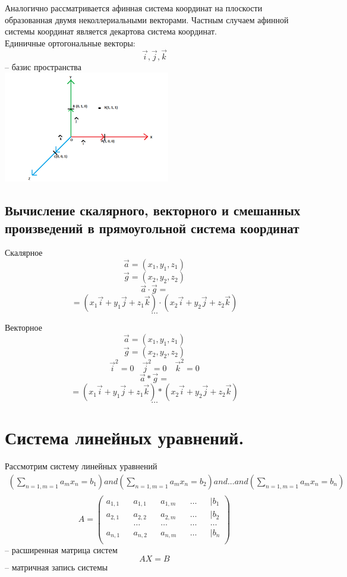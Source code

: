 \documentclass[a4paper, 12pt]{article}
\begin{document}
Аналогично рассматривается афинная система координат на плоскости образованная двумя неколлериальными векторами. Частным случаем афинной системы координат является декартова система координат.\\

Единичные ортогональные векторы:
\[
	\vec{i},\vec{j},\vec{k}   
\]
-- базис пространства\\
\includegraphics{orth_vec}\\

\subsection{Вычисление скалярного, векторного и смешанных произведений в прямоугольной система координат}

Скалярное
\[
	\vec{a} = (x_1,y_1,z_1) 
\]
\[
	\vec{g} = (x_2,y_2,z_2) 
\]
\[
	\vec{a}\cdot \vec{g} =   	
\]
\[
	= (x_1 \vec{i} + y_1 \vec{j} + z_1 \vec{k})\cdot(x_2 \vec{i} + y_2 \vec{j} + z_2 \vec{k})      
\]
\[
	\ldots
\]

Векторное
\[
	\vec{a} = (x_1,y_1,z_1) 
\]
\[
	\vec{g} = (x_2,y_2,z_2) 
\]
\[
	\vec{i}^2 = 0 \quad \vec{j}^2 = 0 \quad \vec{k}^2 = 0   	
\]
\[
	\vec{a}* \vec{g} =   	
\]
\[
	= (x_1 \vec{i} + y_1 \vec{j} + z_1 \vec{k})*(x_2 \vec{i} + y_2 \vec{j} + z_2 \vec{k})      
\]
\[
	\ldots
\]

\section{Система линейных уравнений. }
Рассмотрим систему линейных уравнений
\begin{align*}
	(\sum_{n=1,m=1} a_m x_n = b_1  )and(\sum_{n=1,m=1} a_m x_n = b_2)and ...and(\sum_{n=1,m=1} a_m x_n = b_n)\\	
\end{align*}
\[
	A = \begin{pmatrix}
		a_{1,1} && a_{1,1} && a_{1,m} && \ldots&&| b_1\\
		a_{2,1} && a_{2,2} && a_{2,m}&& \ldots &&| b_2\\
		&& \ldots&& \ldots&& \ldots&& \ldots\\
		a_{n,1} && a_{n,2} && a_{n,m}&& \ldots &&| b_n\\
	\end{pmatrix}
\]
-- расширенная матрица систем
\[
	AX=B
\]
-- матричная запись системы\\
\end{document}
